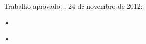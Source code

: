\documentclass[
	12pt,				
	openright,		
	twoside,	
	a4paper,
	english,	
	brazil	
	]{abntex2}
\begin{document}
\begin{folhadeaprovacao}
  \begin{center}
    {\ABNTEXchapterfont\large\imprimirautor}
    \vspace*{\fill}\vspace*{\fill}
    \begin{center}
      \ABNTEXchapterfont\bfseries\Large\imprimirtitulo
    \end{center}
    \vspace*{\fill}
    
    \hspace{.45\textwidth}
    \begin{minipage}{.5\textwidth}
        \imprimirpreambulo
    \end{minipage}%
    \vspace*{\fill}
   \end{center}
        
   Trabalho aprovado. \imprimirlocal, 24 de novembro de 2012:
      
   \begin{center}
    \vspace*{0.5cm}
    {\large\imprimirlocal}
    \par
    {\large\imprimirdata}
    \vspace*{1cm}
  \end{center}
  
\end{folhadeaprovacao}
\begin{dedicatoria}
   \vspace*{\fill}
   \centering
   \noindent
   \textit{•} \vspace*{\fill}
\end{dedicatoria}
\begin{agradecimentos}
\end{agradecimentos}
\begin{epigrafe}
    \vspace*{\fill}
	\begin{flushright}
		\textit{•}
	\end{flushright}
\end{epigrafe}
\end{document}

